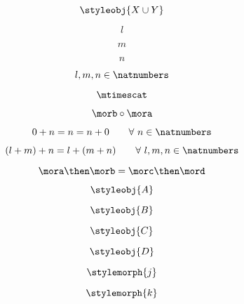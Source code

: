 {\begin{forslides}
		\begin{equation}
			\label{eq:37}
			\styleobj{X \cup Y}
		\end{equation}

		\begin{equation}
			\label{eq:38}
			l
		\end{equation}

		\begin{equation}
			\label{eq:39}
			m
		\end{equation}

		\begin{equation}
			\label{eq:40}
			n
		\end{equation}

		\begin{equation}
			\label{eq:41}
			l, m, n \in \natnumbers
		\end{equation}

		\begin{equation}
			\label{eq:42}
			\mtimescat
		\end{equation}

		\begin{equation}
			\label{eq:43}
			\morb \circ \mora
		\end{equation}

		\begin{equation}
			\label{eq:44}
			0 + n = n = n + 0   \quad \quad \forall \ n \in \natnumbers
		\end{equation}

		\begin{equation}
			\label{eq:45}
			(l + m) + n = l + (m + n) \quad \quad  \forall \ l, m, n \in \natnumbers
		\end{equation}

		\begin{equation}
			\label{eq:46}
			\mora \then \morb = \morc \then \mord
		\end{equation}

		\begin{equation}
			\label{eq:47}
			\styleobj{A}
		\end{equation}

		\begin{equation}
			\label{eq:48}
			\styleobj{B}
		\end{equation}

		\begin{equation}
			\label{eq:49}
			\styleobj{C}
		\end{equation}

		\begin{equation}
			\label{eq:50}
			\styleobj{D}
		\end{equation}

		\begin{equation}
			\label{eq:51}
			\stylemorph{j}
		\end{equation}

		\begin{equation}
			\label{eq:52}
			\stylemorph{k}
		\end{equation}

	\end{forslides}
}

